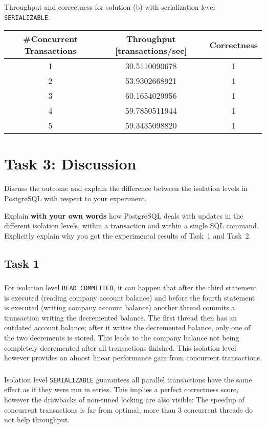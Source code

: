 \documentclass[11pt]{scrartcl}
\begin{document}
Throughput and correctness for solution (b) with serialization level
{\tt\small SERIALIZABLE}.

\bigskip

\begin{tabular}{c|c|c}
  \#Concurrent Transactions & Throughput [transactions/sec] & Correctness
  \\\hline
  1 & 30.5110090678 & 1\\
  2 & 53.9302668921 & 1\\
  3 & 60.1654029956 & 1\\
  4 & 59.7850511944 & 1\\
  5 & 59.3435098820 & 1\\    
\end{tabular}

\medskip

\section*{Task 3: Discussion}

Discuss the outcome and explain the difference between the isolation
levels in PostgreSQL with respect to your experiment.

Explain {\bf with your own words} how PostgreSQL deals with updates in
the different isolation levels, within a transaction and within a
single SQL command. Explicitly explain why you got the experimental
results of Task~1 and Task~2.

\subsection*{Task 1}

\subsubsection*{}
For isolation level {\tt\small READ COMMITTED}, it can happen that
after the third statement is executed (reading company account balance) and
before the fourth statement is executed (writing company account balance) another
thread commits a transaction writing the decremented balance. The first thread
then has an outdated account balance; after it writes the decremented balance, only
one of the two decrements is stored. This leads to the company balance not being
completely decremented after all transactions finished. This isolation level however
provides an almost linear performance gain from concurrent transactions.

\subsubsection*{}
Isolation level {\tt\small SERIALIZABLE} guarantees all parallel transactions
have the same effect as if they were run in series. This implies a perfect correctness
score, however the drawbacks of non-tuned locking are also visible: The speedup of concurrent
transactions is far from optimal, more than 3 concurrent threads do not help throughput.
\end{document}
